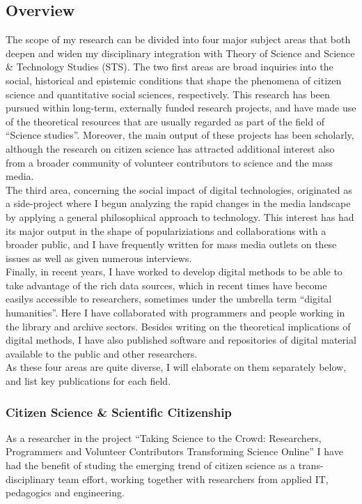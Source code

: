 \documentclass[a4paper,11pt,oneside]{article}
\begin{document}
    \subsection{Overview}
    The scope of my research can be divided into four major subject areas that both
    deepen and widen my disciplinary integration with Theory of Science and Science \&
    Technology Studies (STS). The two first areas are broad inquiries into the social,
    historical and epistemic conditions that shape the phenomena of citizen science and quantitative
    social sciences, respectively. This research has been pursued within long-term,
    externally funded research projects, and have made use of the theoretical resources
    that are usually regarded as part of the field of ``Science studies''. Moreover, the main
    output of these projects has been scholarly, although the research on citizen
    science has attracted additional interest also from a broader community of volunteer
    contributors to science and the mass media.\\

    The third area, concerning the social impact of digital technologies, originated as a
    side-project where I begun analyzing the rapid changes in the media landscape
    by applying a general philosophical approach to technology. This interest has
    had its major output in the shape of populariziations and collaborations with
    a broader public, and I have frequently written for mass media outlets on these
    issues as well as given numerous interviews.\\

    Finally, in recent years, I have worked to develop digital methods to be able to
    take advantage of the rich data sources, which in recent times have become
    easilys accessible to researchers, sometimes under the umbrella term ``digital humanities''.
    Here I have collaborated with programmers and people working in the library and
    archive sectors. Besides writing on the theoretical implications
    of digital methods, I have also published software and repositories of digital
    material available to the public and other researchers.\\

    As these four areas are quite diverse, I will elaborate on them separately
    below, and list key publications for each field. \\


    \subsubsection{Citizen Science \& Scientific Citizenship}
    As a researcher in the project ``Taking Science to the Crowd: Researchers,
    Programmers and Volunteer Contributors Transforming Science Online'' I have had
    the benefit of studing the emerging trend of citizen science as a trans-disciplinary
    team effort, working together with researchers from applied IT, pedagogics and engineering. \\
\end{document}
